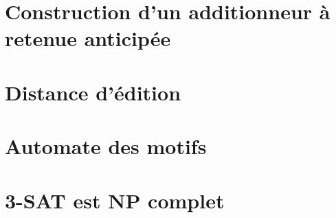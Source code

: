 \chapter{Construction d'un additionneur à retenue anticipée}\label{D63}


\chapter{Distance d'édition}\label{D64}


\chapter{Automate des motifs}\label{D65}


\chapter{3-SAT est NP complet}\label{D66}
 


